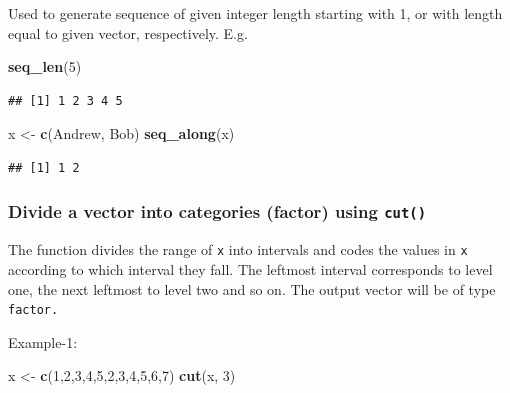 \documentclass[
]{book}
\newenvironment{Shaded}{\begin{snugshade}}{\end{snugshade}}
\newcommand{\DecValTok}[1]{\textcolor[rgb]{0.00,0.00,0.81}{#1}}
\newcommand{\FunctionTok}[1]{\textcolor[rgb]{0.13,0.29,0.53}{\textbf{#1}}}
\newcommand{\NormalTok}[1]{#1}
\newcommand{\OtherTok}[1]{\textcolor[rgb]{0.56,0.35,0.01}{#1}}
\newcommand{\StringTok}[1]{\textcolor[rgb]{0.31,0.60,0.02}{#1}}
\begin{document}
Used to generate sequence of given integer length starting with 1, or with length equal to given vector, respectively. E.g.

\begin{Shaded}
\begin{Highlighting}[]
\FunctionTok{seq\_len}\NormalTok{(}\DecValTok{5}\NormalTok{)}
\end{Highlighting}
\end{Shaded}

\begin{verbatim}
## [1] 1 2 3 4 5
\end{verbatim}

\begin{Shaded}
\begin{Highlighting}[]
\NormalTok{x }\OtherTok{\textless{}{-}} \FunctionTok{c}\NormalTok{(}\StringTok{\textquotesingle{}Andrew\textquotesingle{}}\NormalTok{, }\StringTok{\textquotesingle{}Bob\textquotesingle{}}\NormalTok{)}
\FunctionTok{seq\_along}\NormalTok{(x)}
\end{Highlighting}
\end{Shaded}

\begin{verbatim}
## [1] 1 2
\end{verbatim}

\hypertarget{divide-a-vector-into-categories-factor-using-cut}{%
\subsubsection*{\texorpdfstring{Divide a vector into categories (factor) using \texttt{cut()}}{Divide a vector into categories (factor) using cut()}}\label{divide-a-vector-into-categories-factor-using-cut}}

The function divides the range of \texttt{x} into intervals and codes the values in \texttt{x} according to which interval they fall. The leftmost interval corresponds to level one, the next leftmost to level two and so on. The output vector will be of type \texttt{factor.}

Example-1:

\begin{Shaded}
\begin{Highlighting}[]
\NormalTok{x }\OtherTok{\textless{}{-}} \FunctionTok{c}\NormalTok{(}\DecValTok{1}\NormalTok{,}\DecValTok{2}\NormalTok{,}\DecValTok{3}\NormalTok{,}\DecValTok{4}\NormalTok{,}\DecValTok{5}\NormalTok{,}\DecValTok{2}\NormalTok{,}\DecValTok{3}\NormalTok{,}\DecValTok{4}\NormalTok{,}\DecValTok{5}\NormalTok{,}\DecValTok{6}\NormalTok{,}\DecValTok{7}\NormalTok{)}
\FunctionTok{cut}\NormalTok{(x, }\DecValTok{3}\NormalTok{)}
\end{Highlighting}
\end{Shaded}
\end{document}
